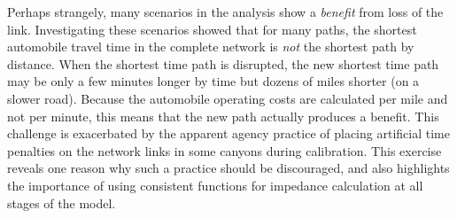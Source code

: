 \documentclass[
  letterpaper,
  number,
  review,
  3p]{elsarticle}
\begin{document}
Perhaps strangely, many scenarios in the analysis show a \emph{benefit}
from loss of the link. Investigating these scenarios showed that for
many paths, the shortest automobile travel time in the complete network
is \emph{not} the shortest path by distance. When the shortest time path
is disrupted, the new shortest time path may be only a few minutes
longer by time but dozens of miles shorter (on a slower road). Because
the automobile operating costs are calculated per mile and not per
minute, this means that the new path actually produces a benefit. This
challenge is exacerbated by the apparent agency practice of placing
artificial time penalties on the network links in some canyons during
calibration. This exercise reveals one reason why such a practice should
be discouraged, and also highlights the importance of using consistent
functions for impedance calculation at all stages of the model.
\end{document}
